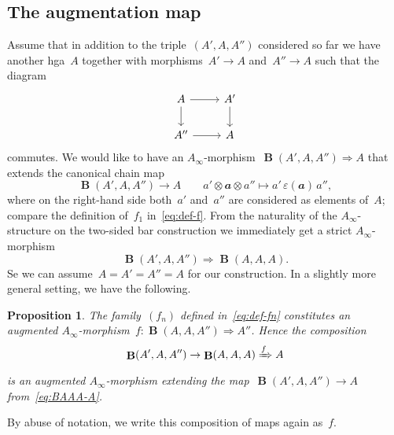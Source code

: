 \documentclass[letterpaper]{amsart}
\numberwithin{equation}{section}
\theoremstyle{plain}
\newtheorem{proposition}[theorem]{Proposition}
\theoremstyle{definition}
\theoremstyle{remark}
\let\epsilon\varepsilon
\def\Ainf{A_{\infty}}
\DeclareMathOperator{\BB}{\mathbf{B}}
\def\aa{\mathbfit{a}}
\def\AA{A}
\def\ff{f_{1}}
\begin{document}
\subsection{The augmentation map}
\label{sec:augm}

Assume that in addition to the triple~$(A',A,A'')$ considered so far
we have another hga~$\AA$ together with morphisms~$A'\to\AA$ and~$A''\to\AA$
such that the diagram
\begin{equation}
  \begin{tikzcd}
    A \arrow{d} \arrow{r} & A' \arrow{d} \\
    A'' \arrow{r} & \AA
  \end{tikzcd}
\end{equation}
commutes. We would like to have an $\Ainf$-morphism~$\BB(A',A,A'')\Rightarrow\AA$
that extends the canonical chain map
\begin{equation}
  \label{eq:BAAA-A}
  \BB(A',A,A'')\to\AA
  \qquad
  a'\otimes\aa\otimes a'' \mapsto a'\,\epsilon(\aa)\,a'',
\end{equation}
where on the right-hand side both~$a'$ and~$a''$ are considered as elements of~$\AA$;
compare the definition of~$\ff$ in~\eqref{eq:def-f}.
From the naturality of the $\Ainf$-structure on the two-sided bar construction
we immediately get a strict $\Ainf$-morphism
\begin{equation}
  \BB(A',A,A'')\Rightarrow \BB(\AA,\AA,\AA).
\end{equation}
Se we can assume~$A=A'=A''=\AA$ for our construction. In a slightly more general setting, we have the following.

\begin{proposition}
  \label{thm:augm-ainf}
  The family~$(f_{n})$ defined in~\eqref{eq:def-fn} constitutes an augmented $\Ainf$-morphism~$f\colon \BB(A,A,A'')\Rightarrow A''$.
  Hence the composition
  \begin{equation*}
    \BB(A',A,A'')\rightarrow \BB(\AA,\AA,\AA) \xRightarrow{f} \AA
  \end{equation*}
  is an augmented $\Ainf$-morphism extending the map~$\BB(A',A,A'')\to\AA$ from~\eqref{eq:BAAA-A}.
\end{proposition}

By abuse of notation, we write this composition of maps again as~$f$.
\end{document}
